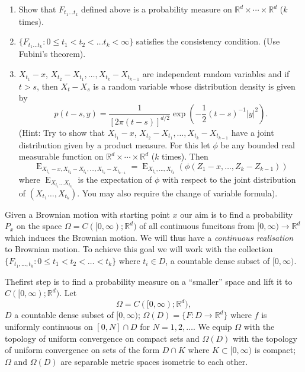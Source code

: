 \begin{exercise}\label{chap4-exer2}
\begin{enumerate}
\renewcommand{\theenumi}{\alph{enumi}}
\renewcommand{\labelenumi}{(\theenumi)}
\item Show that $F_{t_{1}\ldots t_{k}}$ defined above is a probability
  measure on $\mathbb{R}^{d}\times\cdots\times \mathbb{R}^{d}$ ($k$
  times).

\item $\{F_{t_{1}\ldots t_{k}}:0\leq t_{1}<t_{2}<\ldots t_{k}<\infty\}$
  satisfies the consistency condition. (Use Fubini's theorem).

\item $X_{t_{1}}-x$,\pageoriginale
  $X_{t_{2}}-X_{t_{1}},\ldots,X_{t_{k}}-X_{t_{k-1}}$ are independent random
  variables and if $t>s$, then $X_{t}-X_{s}$ is a random variable
  whose distribution density is given by
$$
p(t-s,y)=\frac{1}{[2\pi(t-s)]^{d/2}}\exp\left(-\frac{1}{2}(t-s)^{-1}|y|^{2}\right).
$$
(Hint: Try to show that $X_{t_{1}}-x$,
$X_{t_{2}}-X_{t_{1}},\ldots,X_{t_{k}}-X_{t_{k-1}}$ have a joint
distribution given by a product measure. For this let $\phi$ be any
bounded real measurable function on $\mathbb{R}^{d}\times\cdots\times
\mathbb{R}^{d}$ ($k$ times). Then
$$
{\displaystyle{\mathop{E(\phi(Z_{1},\ldots,Z_{k}))}_{X_{t_{1}}-x,X_{t_{2}}-X_{t_{1}},\ldots,X_{t_{k}}-X_{t_{k-1}}}}}={\displaystyle{\mathop{E}_{X_{t_{1}},\ldots,X_{t_{k}}}}}(\phi(Z_{1}-x,\ldots,Z_{k}-Z_{k-1}))
$$
where ${\displaystyle{\mathop{E(\phi)}_{X_{t_{1}}\ldots X_{t_{k}}}}}$ is the
expectation of $\phi$ with respect to the joint distribution of
$(X_{t_{1}}\ldots,X_{t_{k}})$. You may also require the change of
variable formula).
\end{enumerate}
\end{exercise}

\begin{problem*}
Given a Brownian motion with starting point $x$ our aim is to find a
probability $P_{x}$ on the space $\Omega=C([0,\infty);\mathbb{R}^{d})$
  of all continuous funcitons from $[0,\infty)\to \mathbb{R}^{d}$
    which induces the Brownian motion. We will thus have a {\em
      continuous realisation} to Brownian motion. To achieve this goal
    we will work with the collection $\{F_{t_{1},\ldots,t_{k}}:0\leq
    t_{1}<t_{2}<\ldots<t_{k}\}$ where $t_{i}\in D$, a countable dense
    subset of $[0,\infty)$.
\end{problem*}

\setcounter{step}{0}
\begin{step}%
The\pageoriginale first step is to find a probability measure on a
``smaller'' space and lift it to $C([0,\infty);\mathbb{R}^{d})$. Let
$$
\Omega=C([0,\infty);\mathbb{R}^{d}),
$$
$D$ a countable dense subset of $[0,\infty)$; $\Omega(D)=\{F:D\to
    \mathbb{R}^{d}\}$ where $f$ is uniformly continuous on $[0,N]\cap
    D$ for $N=1,2,\ldots$. We equip $\Omega$ with the topology of
    uniform convergence on compact sets and $\Omega(D)$ with the
    topology of uniform convergence on sets of the form $D\cap K$
    where $K\subset [0,\infty)$ is compact; $\Omega$ and $\Omega(D)$
      are separable metric spaces isometric to each other.
\end{step}

